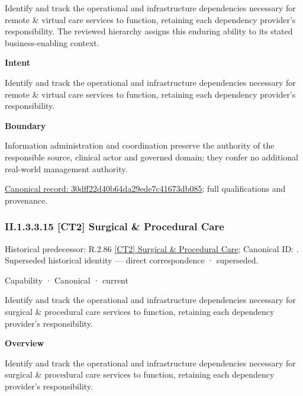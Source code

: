 Identify and track the operational and infrastructure dependencies necessary for remote \& virtual care services to function, retaining each dependency provider's responsibility. The reviewed hierarchy assigns this enduring ability to its stated business-enabling context.



\textbf{Intent}



Identify and track the operational and infrastructure dependencies necessary for remote \& virtual care services to function, retaining each dependency provider's responsibility.



\textbf{Boundary}



Information administration and coordination preserve the authority of the responsible source, clinical actor and governed domain; they confer no additional real-world management authority.


{\footnotesize \href{../../../../continuum/strategy/capability/30dff22d40b64da29ede7c41673db085.md}{Canonical record: 30dff22d40b64da29ede7c41673db085}; full qualifications and provenance.}\par
\subsubsection*{II.1.3.3.15 [CT2] Surgical \& Procedural Care}
\label{navigation:II.1.3.3.15}

{\small Historical predecessor: R.2.86 \hyperref[element:8bc2a106165a4702b5f72fe46a206b69]{[CT2] Surgical \& Procedural Care}; Canonical ID: \texttt{}. Superseded historical identity — direct correspondence · superseded.}\par
\label{element:c9a26d1aa1014545b9ae759b663c807b}
{\small Capability · Canonical · current}\par

Identify and track the operational and infrastructure dependencies necessary for surgical \& procedural care services to function, retaining each dependency provider's responsibility.



\textbf{Overview}



Identify and track the operational and infrastructure dependencies necessary for surgical \& procedural care services to function, retaining each dependency provider's responsibility.



